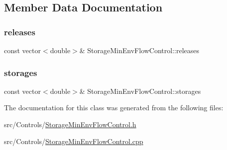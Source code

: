 \subsection{Member Data Documentation}
\mbox{\label{classStorageMinEnvFlowControl_af187563525a0b5b437d27134bff34646}} 
\subsubsection{\texorpdfstring{releases}{releases}}
{\footnotesize\ttfamily const vector$<$double$>$\& Storage\+Min\+Env\+Flow\+Control\+::releases}

\mbox{\label{classStorageMinEnvFlowControl_af68170e5f561f1bfc2062f9e6ec8dd6d}} 
\subsubsection{\texorpdfstring{storages}{storages}}
{\footnotesize\ttfamily const vector$<$double$>$\& Storage\+Min\+Env\+Flow\+Control\+::storages}



The documentation for this class was generated from the following files\+:\begin{DoxyCompactItemize}
\item 
src/\+Controls/\mbox{\hyperlink{StorageMinEnvFlowControl_8h}{Storage\+Min\+Env\+Flow\+Control.\+h}}\item 
src/\+Controls/\mbox{\hyperlink{StorageMinEnvFlowControl_8cpp}{Storage\+Min\+Env\+Flow\+Control.\+cpp}}\end{DoxyCompactItemize}
